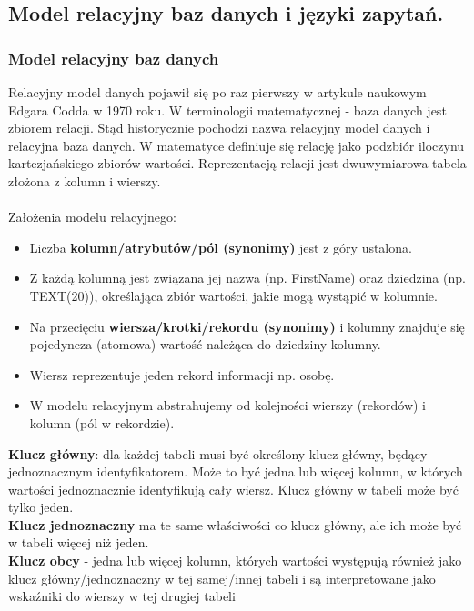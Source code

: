 \documentclass[a4paper,12pt,oneside]{book}
\begin{document}
			\subsection{Model relacyjny baz danych i języki zapytań.}
			
				\subsubsection{Model relacyjny baz danych}
				
				Relacyjny model danych pojawił się po raz pierwszy w artykule naukowym Edgara Codda w 1970 roku.
				W terminologii matematycznej - baza danych jest zbiorem relacji.  Stąd historycznie pochodzi nazwa relacyjny model danych i relacyjna baza danych. W matematyce definiuje się relację jako podzbiór iloczynu kartezjańskiego zbiorów wartości. Reprezentacją relacji jest dwuwymiarowa tabela złożona z kolumn i wierszy. \\ \\ Założenia modelu relacyjnego:
				\begin{itemize}
				\itemsep 0em
				\item Liczba \textbf{kolumn/atrybutów/pól (synonimy)} jest z góry ustalona.
				\item Z każdą kolumną jest związana jej nazwa (np. FirstName) oraz dziedzina (np. TEXT(20)), określająca zbiór wartości, jakie mogą wystąpić w kolumnie.
				\item Na przecięciu \textbf{wiersza/krotki/rekordu (synonimy)} i kolumny znajduje się pojedyncza (atomowa) wartość należąca do dziedziny kolumny.
				\item Wiersz reprezentuje jeden rekord informacji np. osobę.
				\item W modelu relacyjnym abstrahujemy od kolejności wierszy (rekordów) i kolumn (pól w rekordzie).
				\end{itemize}
				
				\noindent \textbf{Klucz główny}: dla każdej tabeli musi być określony klucz główny, będący jednoznacznym identyfikatorem. Może to być jedna lub więcej kolumn, w których wartości jednoznacznie identyfikują cały wiersz. Klucz główny w tabeli może być tylko jeden. \\
				\textbf{Klucz jednoznaczny} ma te same właściwości co klucz główny, ale ich może być w tabeli więcej niż jeden. \\
				\textbf{Klucz obcy} - jedna lub więcej kolumn, których wartości występują również jako klucz główny/jednoznaczny w tej samej/innej tabeli i są interpretowane jako wskaźniki do wierszy w tej drugiej tabeli
				
\end{document}
